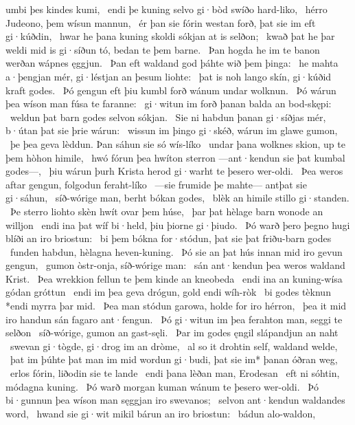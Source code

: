 umbi þes kindes kumi, \hld\ endi þe kuning selvo gi·bòd
swíðo hard-liko, \hld\ hérro Judeono,
þem wísun mannun, \hld\ ér þan sie fórin westan forð,
þat sie im eft gi·kúðdin, \hld\ hwar he þana kuning skoldi
sókjan at is selðon; \hld\ kwað þat he þar weldi mid is gi·síðun tó,
bedan te þem barne. \hld\ Þan hogda he im te banon werðan
wápnes ęggjun. \hld\ Þan eft waldand god
þáhte wið þem þinga: \hld\ he mahta a·þengjan mér,
gi·léstjan an þesum liohte: \hld\ þat is noh lango skín,
gi·kúðid kraft godes. \hld\ Þó gengun eft þiu kumbl forð
wánum undar wolknun. \hld\ Þó wárun þea wíson man
fúsa te faranne: \hld\ gi·witun im forð þanan
balda an bod-skępi: \hld\ weldun þat barn godes
selvon sókjan. \hld\ Sie ni habdun þanan gi·síðjas mér,
b·útan þat sie þrie wárun: \hld\ wissun im þingo gi·skéð,
wárun im glawe gumon, \hld\ þe þea geva lèddun.
Þan sáhun sie só wís-líko \hld\ undar þana wolknes skion,
up te þem hòhon himile, \hld\ hwó fórun þea hwíton sterron
—ant·kendun sie þat kumbal godes—, \hld\ þiu wárun þurh Krista herod
gi·warht te þesero wer-oldi. \hld\ Þea weros aftar gengun,
folgodun feraht-líko \hld\ —sie frumide þe mahte—
antþat sie gi·sáhun, \hld\ síð-wórige man,
berht bókan godes, \hld\ blèk an himile
stillo gi·standen. \hld\ Þe sterro liohto skèn
hwít ovar þem húse, \hld\ þar þat hèlage barn
wonode an willjon \hld\ endi ina þat wíf bi·held,
þiu þiorne gi·þiudo. \hld\ Þó warð þero þegno hugi
blíði an iro briostun: \hld\ bi þem bókna for·stódun,
þat sie þat friðu-barn godes \hld\ funden habdun,
hèlagna heven-kuning. \hld\ Þó sie an þat hús innan
mid iro gevun gengun, \hld\ gumon òstr-onja,
síð-wórige man: \hld\ sán ant·kendun
þea weros waldand Krist. \hld\ Þea wrekkion fellun
te þem kinde an kneobeda \hld\ endi ina an kuning-wísa
gódan gróttun \hld\ endi im þea geva drógun,
gold endi wíh-ròk \hld\ bi godes tèknun
*endi myrra þar mid. \hld\ Þea man stódun garowa,
holde for iro hérron, \hld\ þea it mid iro handun sán
fagaro ant·fengun. \hld\ Þó gi·witun im þea ferahton man,
seggi te selðon \hld\ síð-wórige,
gumon an gast-sęli. \hld\ Þar im godes ęngil
slápandjun an naht \hld\ swevan gi·tògde,
gi·drog im an dròme, \hld\ al so it drohtin self,
waldand welde, \hld\ þat im þúhte þat man im mid wordun gi·budi,
þat sie im* þanan óðran weg, \hld\ erlos fórin,
liðodin sie te lande \hld\ endi þana lèðan man,
Erodesan \hld\ eft ni sóhtin,
módagna kuning. \hld\ Þó warð morgan kuman
wánum te þesero wer-oldi. \hld\ Þó bi·gunnun þea wíson man
sęggjan iro swevanos; \hld\ selvon ant·kendun
waldandes word, \hld\ hwand sie gi·wit mikil
bárun an iro briostun: \hld\ bádun alo-waldon,
